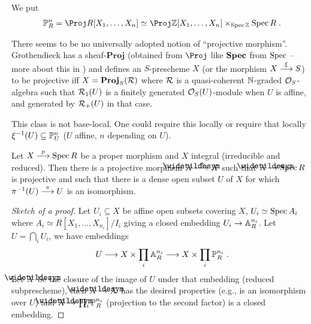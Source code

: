\documentclass[a4paper,parskip=half,numbers=enddot, DIV=12]{scrreprt}
\begin{document}
\begin{defi}
	We put
    \begin{align*}
        \IP^n_R = \Proj R[X_1,\ldots, X_n]\simeq \Proj \IZ[X_1,\ldots,X_n]\times_{\Spec \IZ}\Spec R\;.
    \end{align*}
\end{defi}
\begin{rem}
    There seems to be no universally adopted notion of ``projective morphism''. Grothendieck has a sheaf-$\mathbf{Proj}$ (obtained from $\Proj$ like $\operatorname{\mathbf{Spec}}$ from $\operatorname{Spec}$ -- more about this in \cite[Section~2.3]{alggeo2}) and defines an $S$-prescheme $X$ (or the morphism $X\morphism[\xi] S$) to be projective iff $X= \mathbf{Proj}_S(\mathcal{R})$ where $\mathcal{R}$ is a quasi-coherent $\mathbb{N}$-graded $\mathcal{O}_S$-algebra such that $\mathcal{R}_1(U)$ is a finitely generated $\mathcal{O}_S(U)$-module when $U$ is affine, and generated by $\mathcal{R}_+(U)$ in that case.
    
    This class is not base-local. One could require this locally or require that locally $\xi^{-1}(U) \subseteq \mathbb{P}^n_U$ ($U$ affine, $n$ depending on $U$).
\end{rem}
\begin{prop}
    Let $X\morphism[p] \Spec R$ be a proper morphism and $X$ integral (irreducible and reduced). Then there is a projective morphism $\snake X\morphism[\pi] X$ such that $\snake X\morphism \Spec R$ is projective and such that there is a dense open subset $U$ of $X$ for which $\pi^{-1}(U) \morphism[\pi] U$ is an isomorphism.
\end{prop}
\begin{proof}[Sketch of a proof]
    Let $U_i\subseteq X$ be affine open subsets covering $X$, $U_i\simeq \operatorname{Spec} A_i$ where $A_i\simeq R[X_1,\ldots, X_{n_i}]/I_i$ giving a closed embedding $U_i\morphism \IA^{n_i}_R$. Let $U = \bigcap_i U_i$, we have embeddings 
    \begin{align*}
        U\morphism X\times \prod_i \IA^{n_i}_R\morphism X\times\prod_i \IP^{n_i}_R\;.
    \end{align*}
    Let $\snake X$ be the closure of the image of $U$ under that embedding (reduced subprescheme), then $\snake X\morphism X$ has the desired properties (e.g., is an isomorphism over $U$) and $\snake X\morphism \prod_i \IP^{n_i}_R$ (projection to the second factor) is a closed embedding.
\end{proof}
\end{document}
